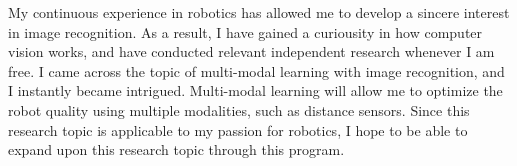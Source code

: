 



%

My continuous experience in robotics 
has allowed me to develop a sincere interest in image recognition. 
As a result, I have gained a curiousity in how computer vision works, 
and have conducted relevant independent research whenever I am free. 
I came across the topic of multi-modal learning with image recognition, and I 
instantly became intrigued. Multi-modal learning will allow me to optimize the robot 
quality using multiple modalities, such as distance sensors. Since this research 
topic is applicable to my passion for robotics, I hope to be able to expand 
upon this research topic through this program.